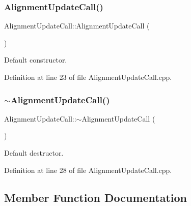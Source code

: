\subsubsection{\texorpdfstring{Alignment\+Update\+Call()}{AlignmentUpdateCall()}}
{\footnotesize\ttfamily Alignment\+Update\+Call\+::\+Alignment\+Update\+Call (\begin{DoxyParamCaption}{ }\end{DoxyParamCaption})}



Default constructor. 



Definition at line 23 of file Alignment\+Update\+Call.\+cpp.

\hypertarget{class_d_d4hep_1_1_alignments_1_1_alignment_update_call_a63a0be9ac654016954dcb1405954ac95}{}\label{class_d_d4hep_1_1_alignments_1_1_alignment_update_call_a63a0be9ac654016954dcb1405954ac95} 
\subsubsection{\texorpdfstring{$\sim$\+Alignment\+Update\+Call()}{~AlignmentUpdateCall()}}
{\footnotesize\ttfamily Alignment\+Update\+Call\+::$\sim$\+Alignment\+Update\+Call (\begin{DoxyParamCaption}{ }\end{DoxyParamCaption})\hspace{0.3cm}{\ttfamily [virtual]}}



Default destructor. 



Definition at line 28 of file Alignment\+Update\+Call.\+cpp.



\subsection{Member Function Documentation}
\hypertarget{class_d_d4hep_1_1_alignments_1_1_alignment_update_call_a5f99eaf1be2d8307eb53f54d570a5ab6}{}\label{class_d_d4hep_1_1_alignments_1_1_alignment_update_call_a5f99eaf1be2d8307eb53f54d570a5ab6} 
